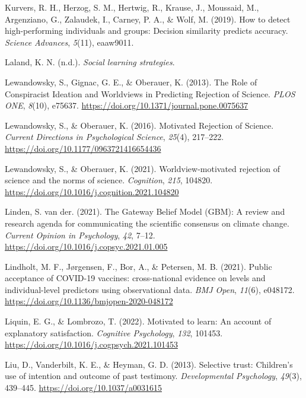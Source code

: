 \documentclass[
  jou,
  floatsintext,
  longtable,
  nolmodern,
  notxfonts,
  notimes,
  colorlinks=true,linkcolor=blue,citecolor=blue,urlcolor=blue]{apa7}
\newlength{\cslhangindent}
\newenvironment{CSLReferences}[2] %
 {\begin{list}{}{%
  \setlength{\itemindent}{0pt}
  \setlength{\leftmargin}{0pt}
  \setlength{\parsep}{0pt}
  \ifodd #1
   \setlength{\leftmargin}{\cslhangindent}
   \setlength{\itemindent}{-1\cslhangindent}
  \fi
  \setlength{\itemsep}{#2\baselineskip}}}
 {\end{list}}
\begin{document}
\begin{CSLReferences}{1}{0}
Kurvers, R. H., Herzog, S. M., Hertwig, R., Krause, J., Moussaid, M.,
Argenziano, G., Zalaudek, I., Carney, P. A., \& Wolf, M. (2019). How to
detect high-performing individuals and groups: Decision similarity
predicts accuracy. \emph{Science Advances}, \emph{5}(11), eaaw9011.

Laland, K. N. (n.d.). \emph{Social learning strategies}.

Lewandowsky, S., Gignac, G. E., \& Oberauer, K. (2013). The Role of
Conspiracist Ideation and Worldviews in Predicting Rejection of Science.
\emph{PLOS ONE}, \emph{8}(10), e75637.
\url{https://doi.org/10.1371/journal.pone.0075637}

Lewandowsky, S., \& Oberauer, K. (2016). Motivated Rejection of Science.
\emph{Current Directions in Psychological Science}, \emph{25}(4),
217--222. \url{https://doi.org/10.1177/0963721416654436}

Lewandowsky, S., \& Oberauer, K. (2021). Worldview-motivated rejection
of science and the norms of science. \emph{Cognition}, \emph{215},
104820. \url{https://doi.org/10.1016/j.cognition.2021.104820}

Linden, S. van der. (2021). The Gateway Belief Model (GBM): A review and
research agenda for communicating the scientific consensus on climate
change. \emph{Current Opinion in Psychology}, \emph{42}, 7--12.
\url{https://doi.org/10.1016/j.copsyc.2021.01.005}

Lindholt, M. F., Jørgensen, F., Bor, A., \& Petersen, M. B. (2021).
Public acceptance of COVID-19 vaccines: cross-national evidence on
levels and individual-level predictors using observational data.
\emph{BMJ Open}, \emph{11}(6), e048172.
\url{https://doi.org/10.1136/bmjopen-2020-048172}

Liquin, E. G., \& Lombrozo, T. (2022). Motivated to learn: An account of
explanatory satisfaction. \emph{Cognitive Psychology}, \emph{132},
101453. \url{https://doi.org/10.1016/j.cogpsych.2021.101453}

Liu, D., Vanderbilt, K. E., \& Heyman, G. D. (2013). Selective trust:
Children's use of intention and outcome of past testimony.
\emph{Developmental Psychology}, \emph{49}(3), 439--445.
\url{https://doi.org/10.1037/a0031615}


\end{CSLReferences}
\end{document}
